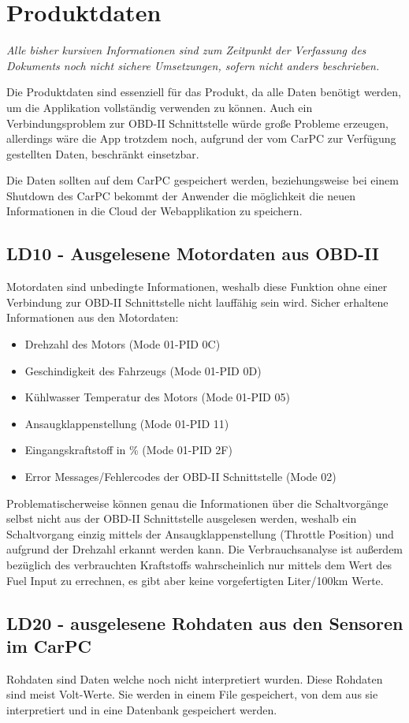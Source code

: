 \chapter{Produktdaten}
\textit{Alle bisher kursiven Informationen sind zum Zeitpunkt der Verfassung des Dokuments noch nicht sichere Umsetzungen, sofern nicht anders beschrieben.}

Die Produktdaten sind essenziell für das Produkt, da alle Daten benötigt werden, um die Applikation vollständig verwenden zu können. Auch ein Verbindungsproblem zur OBD-II Schnittstelle würde große Probleme erzeugen, allerdings wäre die App trotzdem noch, aufgrund der vom CarPC zur Verfügung gestellten Daten, beschränkt einsetzbar.

Die Daten sollten auf dem CarPC gespeichert werden, beziehungsweise bei einem Shutdown des CarPC bekommt der Anwender die möglichkeit die neuen Informationen in die Cloud der Webapplikation zu speichern.

\section{LD10 - Ausgelesene Motordaten aus OBD-II}
Motordaten sind unbedingte Informationen, weshalb diese Funktion ohne einer Verbindung zur OBD-II Schnittstelle nicht lauffähig sein wird.
Sicher erhaltene Informationen aus den Motordaten:
\begin{itemize}
	\item Drehzahl des Motors (Mode 01-PID 0C)
	\item Geschindigkeit des Fahrzeugs (Mode 01-PID 0D)
	\item Kühlwasser Temperatur des Motors (Mode 01-PID 05)
	\item Ansaugklappenstellung (Mode 01-PID 11)
	\item Eingangskraftstoff in \% (Mode 01-PID 2F)
	\item Error Messages/Fehlercodes der OBD-II Schnittstelle (Mode 02)
\end{itemize}
Problematischerweise können genau die Informationen über die Schaltvorgänge selbst nicht aus der OBD-II Schnittstelle ausgelesen werden, weshalb ein Schaltvorgang einzig mittels der Ansaugklappenstellung (Throttle Position) und aufgrund der Drehzahl erkannt werden kann.
Die Verbrauchsanalyse ist außerdem bezüglich des verbrauchten Kraftstoffs wahrscheinlich nur mittels dem Wert des Fuel Input zu errechnen, es gibt aber keine vorgefertigten Liter/100km Werte.

\section{LD20 - ausgelesene Rohdaten aus den Sensoren im CarPC}
Rohdaten sind Daten welche noch nicht interpretiert wurden. Diese Rohdaten sind meist Volt-Werte. Sie werden in einem File gespeichert, von dem aus sie interpretiert und in eine Datenbank gespeichert werden.


